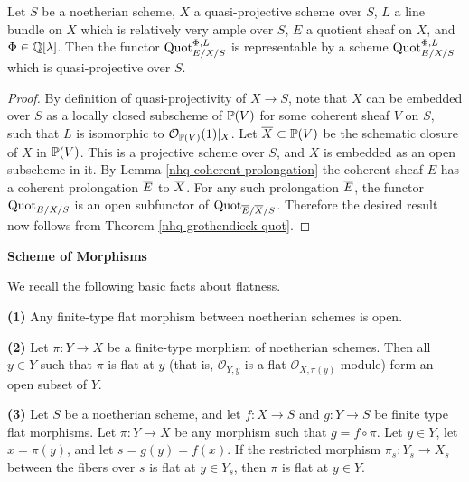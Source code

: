 \begin{theorem}\label{nhq-quasi-projective-quot}
Let $S$ be a noetherian scheme, $X$ a quasi-projective
scheme over $S$, $L$ a line bundle on $X$ which is
relatively very ample over $S$, $E$ a quotient sheaf on $X$,
and $\Phi \in \mathbb{Q}[\lambda]$.
Then the functor $\operatorname{Quot}_{E/X/S}^{\Phi,L}$ is representable
by a scheme $\operatorname{Quot}_{E/X/S}^{\Phi,L}$ which is
quasi-projective over $S$.
\end{theorem}

\begin{proof} By definition of quasi-projectivity of $X\to S$, note that
$X$ can be embedded over $S$ as a locally closed subscheme of
$\mathbb{P}(V)$ for some coherent sheaf $V$ on $S$,
such that $L$ is isomorphic to ${\mathcal O}_{\mathbb{P}(V)}(1)|_X$.
Let $\overline{X} \subset \mathbb{P}(V)$ be the schematic closure of
$X$ in $\mathbb{P}(V)$. This is a projective scheme over $S$, and
$X$ is embedded as an open subscheme in it.
By Lemma \ref{nhq-coherent-prolongation} the
coherent sheaf $E$ has a coherent prolongation $\overline{E}$ to $\overline{X}$.
For any such prolongation $\overline{E}$, the functor
$\operatorname{Quot}_{E/X/S}$ is an open subfunctor of $\operatorname{Quot}_{\overline{E}/\overline{X}/S}$.
Therefore the desired result now follows from Theorem \ref{nhq-grothendieck-quot}.
\end{proof}







\bigskip


\centerline{\large\bf Scheme of Morphisms}


\medskip


We recall the following basic facts about flatness.

\begin{lemma}\label{nhq-local-criterion}
\textbf{(1) } Any finite-type flat morphism between noetherian schemes is open.


\textbf{(2) } Let $\pi : Y \to X$ be a finite-type morphism of
noetherian schemes. Then all $y\in Y$ such that $\pi$ is
flat at $y$ (that is, ${\mathcal O}_{Y,y}$ is a flat ${\mathcal O}_{X,\pi(y)}$-module)
form an open subset of $Y$.


\textbf{(3) } Let $S$ be a noetherian scheme, and let $f:X \to S$
and $g: Y\to S$ be finite type flat morphisms.
Let $\pi : Y \to X$ be any morphism such that $g = f\circ \pi$.
Let $y\in Y$, let $x=\pi(y)$, and let
$s = g(y) = f(x)$. If the restricted
morphism $\pi_s : Y_s \to X_s$ between the
fibers over $s$ is flat at $y\in Y_s$, then $\pi$ is flat at $y\in Y$.
\end{lemma}

